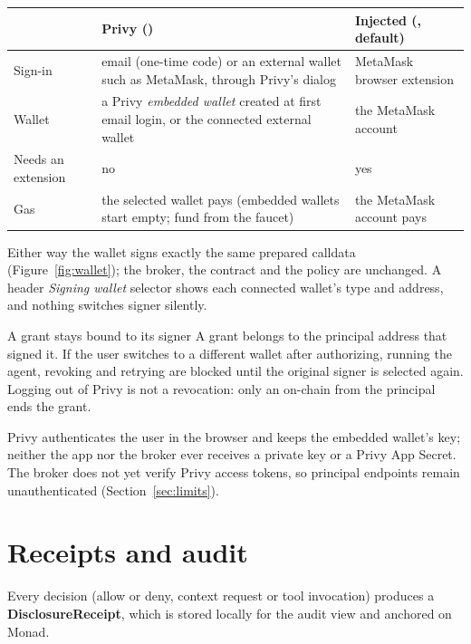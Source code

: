 \documentclass[11pt,a4paper]{article}
\begin{document}
\begin{center}
\renewcommand{\arraystretch}{1.35}
\small
\begin{tabularx}{\textwidth}{@{}l Y Y@{}}
\toprule
 & \textbf{Privy} () & \textbf{Injected} (, default)\\
\midrule
Sign-in & email (one-time code) or an external wallet such as MetaMask, through Privy's dialog & MetaMask browser extension\\
Wallet & a Privy \emph{embedded wallet} created at first email login, or the connected external wallet & the MetaMask account\\
Needs an extension & no & yes\\
Gas & the selected wallet pays (embedded wallets start empty; fund from the faucet) & the MetaMask account pays\\
\bottomrule
\end{tabularx}
\end{center}

Either way the wallet signs exactly the same prepared calldata (Figure~\ref{fig:wallet}); the broker, the contract and the policy are unchanged. A header \emph{Signing wallet} selector shows each connected wallet's type and address, and nothing switches signer silently.

\begin{keyidea}{A grant stays bound to its signer}
A grant belongs to the principal address that signed it. If the user switches to a different wallet after authorizing, running the agent, revoking and retrying are blocked until the original signer is selected again. Logging out of Privy is not a revocation: only an on-chain  from the principal ends the grant.
\end{keyidea}

Privy authenticates the user in the browser and keeps the embedded wallet's key; neither the app nor the broker ever receives a private key or a Privy App Secret. The broker does not yet verify Privy access tokens, so principal endpoints remain unauthenticated (Section~\ref{sec:limits}).

\section{Receipts and audit}\label{sec:receipts}

Every decision (allow or deny, context request or tool invocation) produces a \textbf{DisclosureReceipt}, which is stored locally for the audit view and anchored on Monad.
\end{document}
